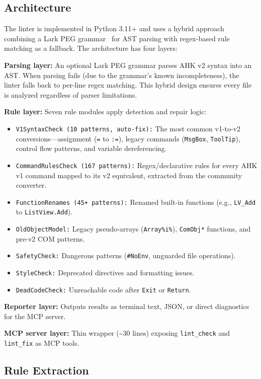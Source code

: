 \documentclass[11pt,a4paper]{article}
\begin{document}
\begin{enumerate}
\subsection{Architecture}

The linter is implemented in Python 3.11+ and uses a hybrid approach combining a Lark PEG grammar~\cite{lark} for AST parsing with regex-based rule matching as a fallback. The architecture has four layers:

\textbf{Parsing layer:} An optional Lark PEG grammar parses AHK v2 syntax into an AST. When parsing fails (due to the grammar's known incompleteness), the linter falls back to per-line regex matching. This hybrid design ensures every file is analyzed regardless of parser limitations.

\textbf{Rule layer:} Seven rule modules apply detection and repair logic:

\begin{itemize}
  \item \texttt{V1SyntaxCheck (10 patterns, auto-fix):} The most common v1-to-v2 conversions---assignment (\texttt{=} to \texttt{:=}), legacy commands (\texttt{MsgBox}, \texttt{ToolTip}), control flow patterns, and variable dereferencing.
  \item \texttt{CommandRulesCheck (167 patterns):} Regex/declarative rules for every AHK v1 command mapped to its v2 equivalent, extracted from the community converter.
  \item \texttt{FunctionRenames (45+ patterns):} Renamed built-in functions (e.g., \texttt{LV\_Add} to \texttt{ListView.Add}).
  \item \texttt{OldObjectModel:} Legacy pseudo-arrays (\texttt{Array\%i\%}), \texttt{ComObj*} functions, and pre-v2 COM patterns.
  \item \texttt{SafetyCheck:} Dangerous patterns (\texttt{\#NoEnv}, unguarded file operations).
  \item \texttt{StyleCheck:} Deprecated directives and formatting issues.
  \item \texttt{DeadCodeCheck:} Unreachable code after \texttt{Exit} or \texttt{Return}.
\end{itemize}

\textbf{Reporter layer:} Outputs results as terminal text, JSON, or direct diagnostics for the MCP server.

\textbf{MCP server layer:} Thin wrapper ({\textasciitilde}30 lines) exposing \texttt{lint\_check} and \texttt{lint\_fix} as MCP tools.

\subsection{Rule Extraction}


\end{enumerate}
\end{document}
